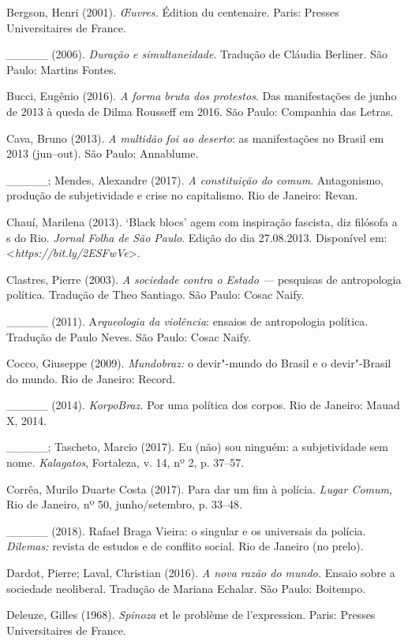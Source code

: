 Bergson, Henri (2001). \emph{Œuvres. }Édition du centenaire. Paris:
Presses Universitaires de France.

\_\_\_\_\_ (2006). \emph{Duração e simultaneidade}. Tradução de Cláudia
Berliner. São Paulo: Martins Fontes.

Bucci, Eugênio (2016). \emph{A forma bruta dos protestos}. Das
manifestações de junho de 2013 à queda de Dilma Rousseff em 2016. São
Paulo: Companhia das Letras.

Cava, Bruno (2013). \emph{A multidão foi ao deserto}: as manifestações
no Brasil em 2013 (jun--out). São Paulo: Annablume.

\_\_\_\_\_; Mendes, Alexandre (2017). \emph{A constituição do comum}.
Antagonismo, produção de subjetividade e crise no capitalismo. Rio de
Janeiro: Revan.

Chauí, Marilena (2013). `Black blocs' agem com inspiração fascista, diz
filósofa a s do Rio. \emph{Jornal Folha de São Paulo}. Edição do dia
27.08.2013. Disponível em:
\textless{}\emph{https://bit.ly/2ESFwVe}\textgreater{}.

Clastres, Pierre (2003). \emph{A sociedade contra o Estado ---} pesquisas
de antropologia política. Tradução de Theo Santiago. São Paulo: Cosac
Naify.

\_\_\_\_\_ (2011). A\emph{rqueologia da violência}: ensaios de
antropologia política. Tradução de Paulo Neves. São Paulo: Cosac Naify.

Cocco, Giuseppe (2009). \emph{Mundobraz: }o devir"-mundo do Brasil e o
devir"-Brasil do mundo. Rio de Janeiro: Record.

\_\_\_\_\_ (2014). \emph{KorpoBraz.} Por uma política dos corpos. Rio de
Janeiro: Mauad X, 2014.

\_\_\_\_\_; Tascheto, Marcio (2017). Eu (não) sou ninguém: a
subjetividade sem nome. \emph{Kalagatos}, Fortaleza, v. 14, nº 2, p.
37--57.

Corrêa, Murilo Duarte Costa (2017). Para dar um fim à polícia.
\emph{Lugar Comum}, Rio de Janeiro, nº 50, junho/setembro, p. 33--48.

\_\_\_\_\_ (2018). Rafael Braga Vieira: o singular e os universais da
polícia.\emph{ Dilemas: }revista de estudos e de conflito social. Rio de
Janeiro (no prelo).

Dardot, Pierre; Laval, Christian (2016). \emph{A nova razão do mundo.
}Ensaio sobre a sociedade neoliberal. Tradução de Mariana Echalar. São
Paulo: Boitempo.

Deleuze, Gilles (1968). \emph{Spinoza} et le problème de l'expression.
Paris: Presses Universitaires de France.

